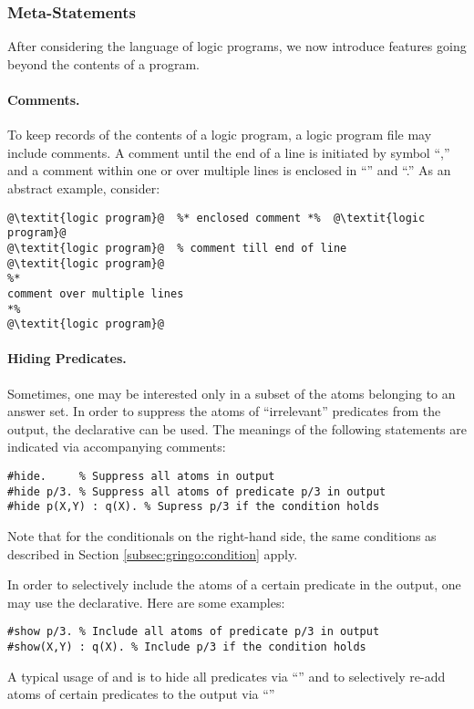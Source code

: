 \subsubsection{Meta-Statements}\label{subsec:gringo:meta}

After considering the language of logic programs,
we now introduce features going beyond the contents of a program.

\paragraph{Comments.}
To keep records of the contents of a logic program,
a logic program file may include comments.
A comment until the end of a line is initiated by symbol ``\code{\%},''
and a comment within one or over multiple lines is enclosed
in ``\code{\%*}'' and ``\code{*\%}.''
As an abstract example, consider:
%
\begin{lstlisting}[numbers=none,escapechar=@]
@\textit{logic program}@  %* enclosed comment *%  @\textit{logic program}@
@\textit{logic program}@  % comment till end of line
@\textit{logic program}@
%*
comment over multiple lines
*%
@\textit{logic program}@
\end{lstlisting}

\paragraph{Hiding Predicates.}
%
Sometimes, one may be interested only in a subset of the atoms belonging
to an answer set.
In order to suppress the atoms of ``irrelevant'' predicates from the output,
the  declarative can be used.
The meanings of the following statements are indicated via accompanying comments:
%
\begin{lstlisting}[numbers=none]
#hide.     % Suppress all atoms in output
#hide p/3. % Suppress all atoms of predicate p/3 in output
#hide p(X,Y) : q(X). % Supress p/3 if the condition holds
\end{lstlisting}
Note that for the conditionals on the right-hand side, 
the same conditions as described in Section \ref{subsec:gringo:condition} apply.

In order to selectively include the atoms of a certain predicate in the output,
one may use the  declarative.
Here are some examples:
%
\begin{lstlisting}[numbers=none]
#show p/3. % Include all atoms of predicate p/3 in output
#show(X,Y) : q(X). % Include p/3 if the condition holds
\end{lstlisting}
%
A typical usage of  and  is to hide all predicates
via ``'' and to selectively re-add atoms of certain predicates
 to the output via ``''


